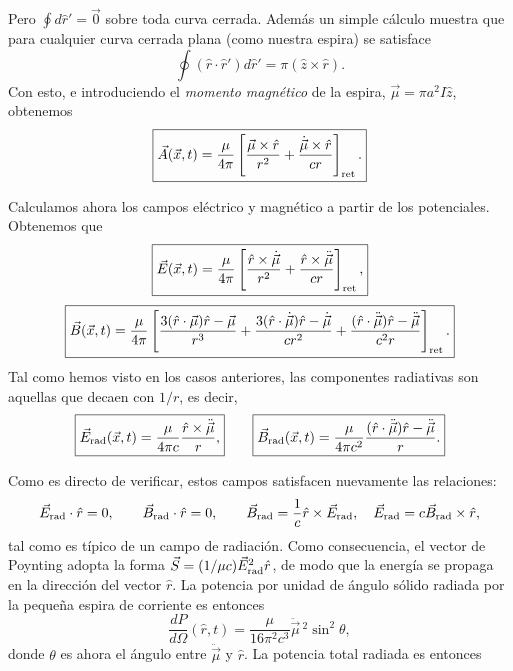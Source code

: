 Pero $\oint d\hat{r}'=\vec{0}$ sobre toda curva cerrada. Además un simple cálculo muestra que para cualquier curva cerrada plana (como nuestra espira) se satisface 
\begin{equation}
\oint(\hat{r}\cdot\hat{r}')d\hat{r}'=\pi(\hat{z}\times\hat{r}) .
\end{equation}
Con esto, e introduciendo el \textit{momento magnético} de la espira, $\vec{\mu}=\pi a^2I\hat{z}$, obtenemos
\begin{equation}
 \boxed{\vec{A}(\vec{x},t)=\frac{\mu}{4\pi}\left[\frac{\vec{\mu}\times\hat{r}}{r^2}+\frac{\dot{\vec{\mu}}\times\hat{r}}{cr}\right]_{\rm ret}.}
\end{equation}

Calculamos ahora los campos eléctrico y magnético a partir de los potenciales. Obtenemos que
\begin{equation}
 \boxed{\vec{E}(\vec{x},t)=\frac{\mu}{4\pi}\left[\frac{\hat{r}\times\dot{\vec{\mu}}}{r^2}+\frac{\hat{r}\times\ddot{\vec{\mu}}}{cr}\right]_{\rm ret},}
\end{equation}
\begin{equation}
\boxed{ \vec{B}(\vec{x},t)=\frac{\mu}{4\pi}\left[\frac{3(\hat{r}\cdot\vec{\mu})\hat{r}-\vec{\mu}}{r^3}+\frac{3(\hat{r}\cdot\dot{\vec{\mu}})\hat{r}-\dot{\vec{\mu}}}{cr^2}+\frac{(\hat{r}\cdot\ddot{\vec{\mu}})\hat{r}-\ddot{\vec{\mu}}}{c^2r}\right]_{\rm ret}.}
\end{equation}
Tal como hemos visto en los casos anteriores, las componentes radiativas son aquellas que decaen con $1/r$, es decir,
\begin{equation}
 \boxed{\vec{E}_{\rm rad}(\vec{x},t)
=\frac{\mu}{4\pi c}\frac{\hat{r}\times\ddot{\vec{\mu}}}{r},} \qquad
 \boxed{\vec{B}_{\rm rad}(\vec{x},t)=\frac{\mu}{4\pi c^2}\frac{(\hat{r}\cdot\ddot{\vec{\mu}})\hat{r}-\ddot{\vec{\mu}}}{r}.}
\end{equation}

Como es directo de verificar, estos campos satisfacen nuevamente las relaciones:
\begin{equation}
\vec{E}_{\rm rad}\cdot\hat{r}=0, \qquad \vec{B}_{\rm rad}\cdot\hat{r}=0, \qquad \vec{B}_{\rm rad}=\frac{1}{c}\hat{r}\times\vec{E}_{\rm rad}, \quad \vec{E}_{\rm rad}=c\vec{B}_{\rm rad}\times\hat{r},
\end{equation}
tal como es típico de un campo de radiación. Como consecuencia, el vector de Poynting adopta la forma $\vec{S}=(1/\mu c)\vec{E}_{\rm rad}^2\hat{r}$, de modo que la energía se propaga en la dirección del vector $\hat{r}$. La potencia por unidad de ángulo sólido radiada por la pequeña espira de corriente es entonces
\begin{equation}
\boxed{\frac{dP}{d\Omega}(\hat{r},t)=\frac{\mu}{16\pi^2 c^3}\ddot{\vec{\mu}}{\,}^2\sin^2\theta ,}
\end{equation}
donde $\theta$ es ahora el ángulo entre $\ddot{\vec{\mu}}$ y $\hat{r}$. La potencia total radiada es entonces

